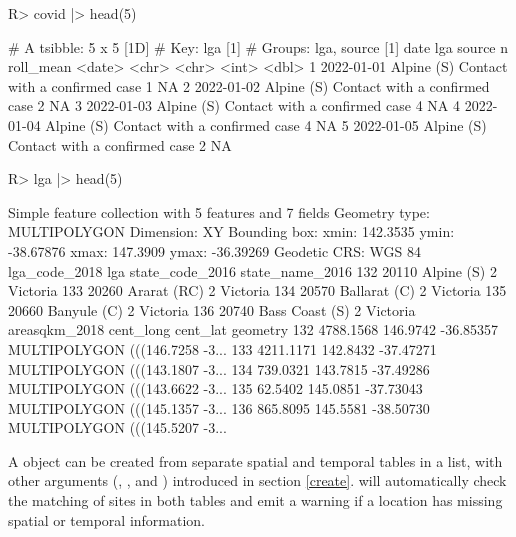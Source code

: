 \documentclass[
]{jss}
\begin{document}
\begin{CodeChunk}
\begin{CodeInput}
R> covid |> head(5)
\end{CodeInput}
\begin{CodeOutput}
# A tsibble: 5 x 5 [1D]
# Key:       lga [1]
# Groups:    lga, source [1]
  date       lga        source                            n roll_mean
  <date>     <chr>      <chr>                         <int>     <dbl>
1 2022-01-01 Alpine (S) Contact with a confirmed case     1        NA
2 2022-01-02 Alpine (S) Contact with a confirmed case     2        NA
3 2022-01-03 Alpine (S) Contact with a confirmed case     4        NA
4 2022-01-04 Alpine (S) Contact with a confirmed case     4        NA
5 2022-01-05 Alpine (S) Contact with a confirmed case     2        NA
\end{CodeOutput}
\begin{CodeInput}
R> lga |> head(5)
\end{CodeInput}
\begin{CodeOutput}
Simple feature collection with 5 features and 7 fields
Geometry type: MULTIPOLYGON
Dimension:     XY
Bounding box:  xmin: 142.3535 ymin: -38.67876 xmax: 147.3909 ymax: -36.39269
Geodetic CRS:  WGS 84
    lga_code_2018            lga state_code_2016 state_name_2016
132         20110     Alpine (S)               2        Victoria
133         20260    Ararat (RC)               2        Victoria
134         20570   Ballarat (C)               2        Victoria
135         20660    Banyule (C)               2        Victoria
136         20740 Bass Coast (S)               2        Victoria
    areasqkm_2018 cent_long  cent_lat                       geometry
132     4788.1568  146.9742 -36.85357 MULTIPOLYGON (((146.7258 -3...
133     4211.1171  142.8432 -37.47271 MULTIPOLYGON (((143.1807 -3...
134      739.0321  143.7815 -37.49286 MULTIPOLYGON (((143.6622 -3...
135       62.5402  145.0851 -37.73043 MULTIPOLYGON (((145.1357 -3...
136      865.8095  145.5581 -38.50730 MULTIPOLYGON (((145.5207 -3...
\end{CodeOutput}
\end{CodeChunk}

A  object can be created from separate spatial and temporal tables in a list, with other arguments (, , and ) introduced in section \ref{create}.  will automatically check the matching of sites in both tables and emit a warning if a location has missing spatial or temporal information.
\end{document}
